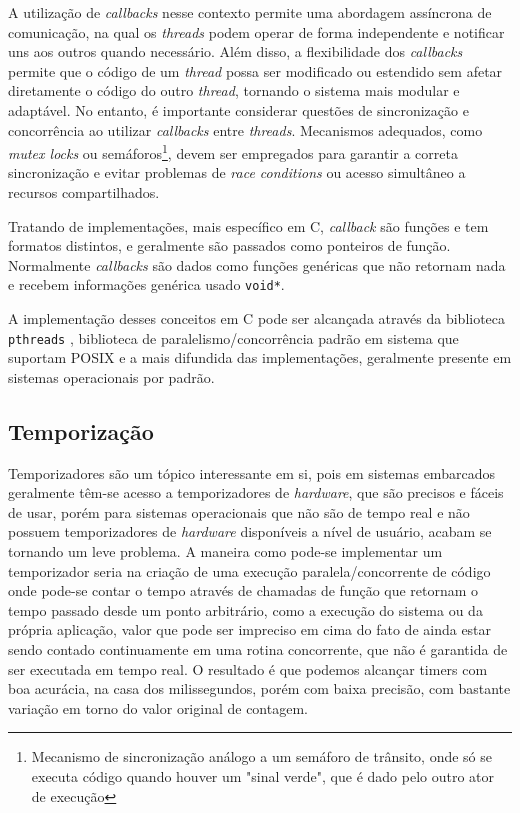 A utilização de \textit{callbacks} nesse contexto permite uma abordagem assíncrona de comunicação, na qual os \textit{threads} podem operar de forma independente e notificar uns aos outros quando necessário. Além disso, a flexibilidade dos \textit{callbacks} permite que o código de um \textit{thread} possa ser modificado ou estendido sem afetar diretamente o código do outro \textit{thread}, tornando o sistema mais modular e adaptável. No entanto, é importante considerar questões de sincronização e concorrência ao utilizar \textit{callbacks} entre \textit{threads}. Mecanismos adequados, como \textit{mutex locks} ou semáforos\footnote{Mecanismo de sincronização análogo a um semáforo de trânsito, onde só se executa código quando houver um "sinal verde", que é dado pelo outro ator de execução}, devem ser empregados para garantir a correta sincronização e evitar problemas de \textit{race conditions} ou acesso simultâneo a recursos compartilhados.

Tratando de implementações, mais específico em C, \textit{callback} são funções e tem formatos distintos, e geralmente são passados como ponteiros de função. Normalmente \textit{callbacks} são dados como funções genéricas que não retornam nada e recebem informações genérica usado \lstinline{void*}.



A implementação desses conceitos em C pode ser alcançada através da biblioteca \lstinline{pthreads} \cite{pthreads}, biblioteca de paralelismo/concorrência padrão em sistema que suportam POSIX e a mais difundida das implementações, geralmente presente em sistemas operacionais por padrão.    

\subsection{Temporização}

Temporizadores são um tópico interessante em si, pois em sistemas embarcados geralmente têm-se acesso a temporizadores de \textit{hardware}, que são precisos e fáceis de usar, porém para sistemas operacionais que não são de tempo real e não possuem temporizadores de \textit{hardware} disponíveis a nível de usuário, acabam se tornando um leve problema. A maneira como pode-se implementar um temporizador seria na criação de uma execução paralela/concorrente de código onde pode-se contar o tempo através de chamadas de função que retornam o tempo passado desde um ponto arbitrário, como a execução do sistema ou da própria aplicação, valor que pode ser impreciso em cima do fato de ainda estar sendo contado continuamente em uma rotina concorrente, que não é garantida de ser executada em tempo real. O resultado é que podemos alcançar timers com boa acurácia, na casa dos milissegundos, porém com baixa precisão, com bastante variação em torno do valor original de contagem.

